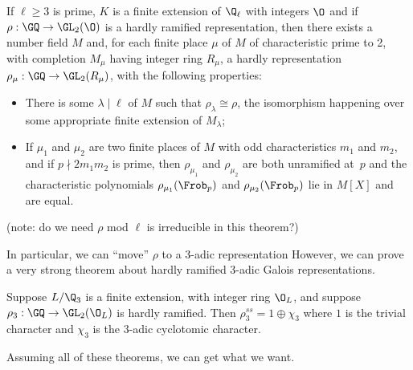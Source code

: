 \begin{theorem}
  \label{hardly-ramified-spreads-out}
  If $\ell\geq3$ is prime, $K$ is a finite extension of $\Q_\ell$
  with integers $\O$ and if $\rho:\GQ\to\GL_2(\O)$ is a hardly ramified representation,
  then there exists a number field $M$ and, for each finite place $\mu$ of $M$
  of characteristic prime to 2, with completion $M_\mu$ having integer ring $R_\mu$,
  a hardly representation $\rho_\mu:\GQ\to\GL_2(R_\mu)$, with the following properties:
  \begin{itemize}
    \item There is some $\lambda\mid\ell$ of $M$ such that $\rho_\lambda\cong\rho$,
      the isomorphism happening over some appropriate finite extension of $M_\lambda$;
    \item If $\mu_1$ and $\mu_2$ are two finite places of $M$ with odd characteristics $m_1$
      and $m_2$, and if $p\nmid 2m_1m_2$ is prime, then $\rho_{\mu_1}$ and $\rho_{\mu_2}$
      are both unramified at~$p$ and the characteristic polynomials $\rho_{\mu_1}(\Frob_p)$
      and $\rho_{\mu_2}(\Frob_p)$ lie in $M[X]$ and are equal.
  \end{itemize}
\end{theorem}

(note: do we need $\rho$ mod $\ell$ is irreducible in this theorem?)

In particular, we can ``move'' $\rho$ to a 3-adic representation
However, we can prove a very strong theorem about hardly ramified 3-adic Galois representations.

\begin{theorem}
  \label{hardly-ramified-3adic-reducible}
  Suppose $L/\Q_3$ is a finite extension, with integer ring $\O_L$, and suppose
  $\rho_3:\GQ\to\GL_2(\O_L)$ is hardly ramified. Then $\rho_3^{ss}=1\oplus\chi_3$
  where $1$ is the trivial character and $\chi_3$ is the 3-adic cyclotomic character.
\end{theorem}

Assuming all of these theorems, we can get what we want.

